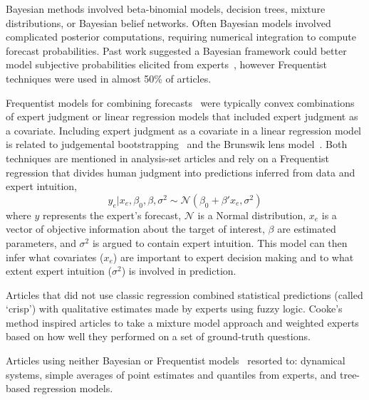 \documentclass[preprint,authoryear]{elsarticle}
\begin{document}
Bayesian methods involved beta-binomial models, decision trees, mixture distributions, or Bayesian belief networks.
Often Bayesian models involved complicated posterior computations, requiring numerical integration to compute forecast probabilities.
Past work suggested a Bayesian framework could better model subjective probabilities elicited from experts~\citep{clemen2007advances}, however Frequentist techniques were used in almost 50\% of articles. 

Frequentist models for combining forecasts~\citep{cooke2014out,klas2010support,mak1996aggregating,hurley2002combining,morales2017characterization,borsuk2004predictive,hanea2018value,cabello2012combination,adams2009acceptability,alho1992estimating,evans1994use,jana2019interval,hora2015calibration,hathout2016uncertainty,wang2008probabilistic,ren2002optimal,kurowicka2010probabilistic,baldwin2015weighting,baecke2017investigating,seifert2013relative,gu2016expert,mu1999multi,graefe2014combining,alvarado2017expertise,shin2013robust,franses2011averaging} were typically convex combinations of expert judgment or linear regression models that included expert judgment as a covariate.
Including expert judgment as a covariate in a linear regression model is related to judgemental bootstrapping~\citep{armstrong2001judgmental} and the Brunswik lens model~\cite{hammond2001essential}. 
Both techniques are mentioned in analysis-set articles and rely on a Frequentist regression that divides human judgment into predictions inferred from data and expert intuition,
\begin{equation*}
  y_{e} | x_{e}, \beta_{0}, \beta, \sigma^{2}  \sim \mathcal{N}( \beta_{0} + \beta'x_{e} ,\sigma^{2})
\end{equation*}
where $y$ represents the expert's forecast, $\mathcal{N}$ is a Normal distribution, $x_{e}$ is a vector of objective information about the target of interest, $\beta$ are estimated parameters, and $\sigma^{2}$ is argued to contain expert intuition.
This model can then infer what covariates ($x_{e}$) are important to expert decision making and to what extent expert intuition ($\sigma^{2}$) is involved in prediction.

Articles that did not use classic regression combined statistical predictions (called `crisp') with qualitative estimates made by experts using fuzzy logic.
Cooke's method inspired articles to take a mixture model approach and weighted experts based on how well they performed on a set of ground-truth questions.

Articles using neither Bayesian or Frequentist models~\citep{johnson2018making,li2012preliminary,petrovic2006fuzzy,song2013combining,graefe2014accuracy,morgan2014use,cai2016simple,kabak2008aggregating,graefe2015accuracy,graefe2018predicting,failing2004using,ren2002optimal,hora2013median,baron2014two} resorted to: dynamical systems, simple averages of point estimates and quantiles from experts, and tree-based regression models.
\end{document}
